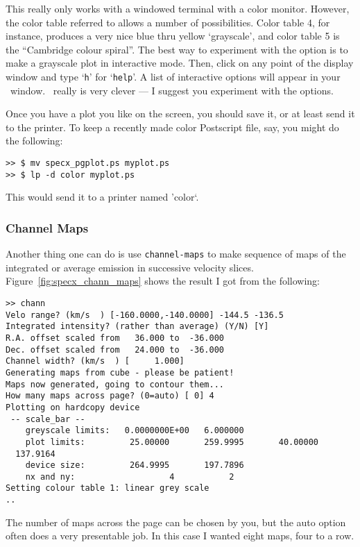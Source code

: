 This really only works with a windowed terminal with a color
monitor. However, the color table referred to allows a number of
possibilities. Color table 4, for instance, produces a very nice blue
thru yellow `grayscale', and color table 5 is the ``Cambridge colour
spiral''. The best way to experiment with the option is to make a
grayscale plot in interactive mode.  Then, click on any point of the
display window and type `{\tt h}' for `{\tt help}'. A list of
interactive options will appear in your \SPECX\ window. \SPECX\ really
is very clever --- I suggest you experiment with the options.

Once you have a plot you like on the screen, you should save it, or at
least send it to the printer. To keep a recently made color Postscript
file, say, you might do the following:

\verb|>> $ mv specx_pgplot.ps myplot.ps|\\
\verb|>> $ lp -d color myplot.ps|

This would send it to a printer named 'color`.

\subsubsection{Channel Maps}
\label{sec:specx_13.5}
Another thing one can do is use {\tt channel-maps} to make sequence of
maps of the integrated or average emission in successive velocity
slices.  Figure~\ref{fig:specx_chann_maps} shows the result I got from
the following:

\begin{verbatim}
>> chann
Velo range? (km/s  ) [-160.0000,-140.0000] -144.5 -136.5
Integrated intensity? (rather than average) (Y/N) [Y]
R.A. offset scaled from   36.000 to  -36.000
Dec. offset scaled from   24.000 to  -36.000
Channel width? (km/s  ) [     1.000]
Generating maps from cube - please be patient!
Maps now generated, going to contour them...
How many maps across page? (0=auto) [ 0] 4
Plotting on hardcopy device
 -- scale_bar --
    greyscale limits:   0.0000000E+00   6.000000
    plot limits:         25.00000       259.9995       40.00000
  137.9164
    device size:         264.9995       197.7896
    nx and ny:                   4           2
Setting colour table 1: linear grey scale
..
\end{verbatim}

The number of maps across the page can be chosen by you, but the auto
option often does a very presentable job. In this case I wanted eight
maps, four to a row.

